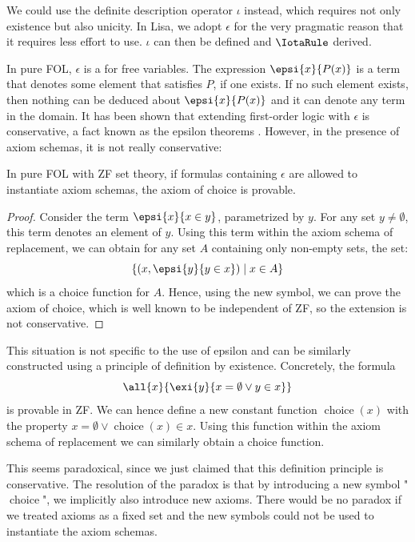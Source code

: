 We could use the definite description operator $\iota$ instead, which requires not only existence but also unicity. In Lisa, we adopt $\epsilon$ for the very pragmatic reason that it requires less effort to use. $\iota$ can then be defined and $\IotaRule$ derived.

In pure FOL, $\epsilon$ is a for free variables. The expression $\epsi{x}{P(x)}$ is a term that denotes some element that satisfies $P$, if one exists. If no such element exists, then nothing can be deduced about $\epsi{x}{P(x)}$ and it can denote any term in the domain. 
It has been shown that extending first-order logic with $\epsilon$ is conservative, a fact known as the epsilon theorems \cite{troelstraBasicProofTheory2000}. However, in the presence of axiom schemas, it is not really conservative:

\begin{lemma}
    In pure FOL with ZF set theory, if formulas containing $\epsilon$ are allowed to instantiate axiom schemas, the axiom of choice is provable.

\end{lemma}
\begin{proof}
    Consider the term $\epsi{x}{x \in y}$, parametrized by $y$. For any set $y \neq \emptyset$, this term denotes an element of $y$. Using this term within the axiom schema of replacement, we can obtain for any set $A$ containing only non-empty sets, the set:
    $$
        \lbrace (x, \epsi{y}{y \in x}) \mid x \in A \rbrace
    $$
    which is a choice function for $A$. Hence, using the new symbol, we can prove the axiom of choice, which is well known to be independent of ZF, so the extension is not conservative.
\end{proof}

This situation is not specific to the use of epsilon and can be similarly constructed using a principle of definition by existence. Concretely, the formula
$$\all{x}{\exi{y}{x = \emptyset \lor y \in x}}$$
is provable in ZF. We can hence define a new constant function $\operatorname{choice}(x)$ with the property $x = \emptyset \lor \operatorname{choice}(x) \in x$. Using this function within the axiom schema of replacement we can similarly obtain a choice function.

This seems paradoxical, since we just claimed that this definition principle is conservative. The resolution of the paradox is that by introducing a new symbol "$\operatorname{choice}$", we implicitly also introduce new axioms. There would be no paradox if we treated axioms as a fixed set and the new symbols could not be used to instantiate the axiom schemas.

